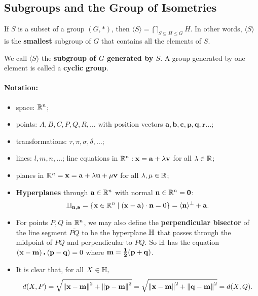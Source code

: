 \subsection{Subgroups and the Group of Isometries}

\begin{lemma}
    If \(S\) is a subset of a group \((G, *)\), then \(\langle S \rangle = \bigcap_{S \subseteq H \leq G} H\). In other words, \(\langle S \rangle\) is the \textbf{smallest} subgroup of \(G\) that contains all the elements of \(S\).
\end{lemma}

\begin{definition}
    We call \(\langle S \rangle\) the \textbf{subgroup of \(G\) generated by \(S\)}. A group generated by one element is called a \textbf{cyclic group}.
\end{definition}

\paragraph{Notation:}
\begin{itemize}
    \item space: \(\mathbb{R}^n\);
    \item points: \(A, B, C, P, Q, R, \dots\) with position vectors \(\mathbf{a, b, c, p , q, r} \dots\);
    \item transformations: \(\tau, \pi, \sigma, \delta, \dots\);
    \item lines: \(l, m, n, \dots\); line equations in \(\mathbb{R}^n: \mathbf{x} = \mathbf{a} + \lambda \mathbf{v}\) for all \(\lambda \in \mathbb{R}\);
    \item planes in \(\mathbb{R}^n = \mathbf{x} = \mathbf{a} + \lambda \mathbf{u} + \mu \mathbf{v}\) for all \(\lambda, \mu \in \mathbb{R}\);
    \item \textbf{Hyperplanes} through \(\mathbf{a} \in \mathbb{R}^n\) with normal \(\mathbf{n} \in \mathbb{R}^n = \mathbf{0}\):
          \[\mathbb{H}_{\mathbf{n, a}} = \{ \mathbf{x} \in \mathbb{R}^n \mid (\mathbf{x} - \mathbf{a}) \cdot \mathbf{n} = 0 \} = \langle \mathbf{n} \rangle^\perp + \mathbf{a}. \]
    \item For points \(P, Q\) in \(\mathbb{R}^n\), we may also define the \textbf{perpendicular bisector} of the line segment \(\bar{PQ}\) to be the hyperplane \(\mathbb{H}\) that passes through the midpoint of \(\bar{PQ}\) and perpendicular to \(\bar{PQ}\). So \(\mathbb{H}\) has the equation \(\mathbf{(x - m) \centerdot (p - q)} = 0\) where \(\mathbf{m = \frac{1}{2} (p + q)}\).
    \item It is clear that, for all \(X \in \mathbb{H},\)
          \[d(X, P) = \sqrt{\norm{\mathbf{x - m}}^2 + \norm{\mathbf{p - m}}^2} = \sqrt{\norm{\mathbf{x - m}}^2 + \norm{\mathbf{q - m}}^2} = d(X, Q).\]
\end{itemize}

